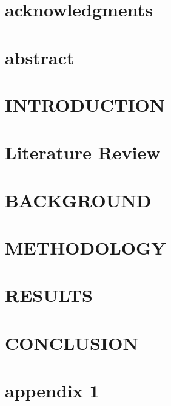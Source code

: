 \documentclass[12pt, twoside, openright]{report}
\begin{document}
	

	
	
	\chapter*{acknowledgments}
	
	\newpage
	
	\chapter*{abstract}
	
	
	
	\tableofcontents
	\listoffigures
	
	
	
	\chapter{INTRODUCTION}
	
	
	\chapter{Literature Review}
	
	
	\chapter{BACKGROUND}
	
	
	\chapter{METHODOLOGY}
	
	
	\chapter{RESULTS}
	
	
	\chapter{CONCLUSION}
	
	
	\appendix
	\chapter{appendix 1}
	
	
	
	
\end{document}
